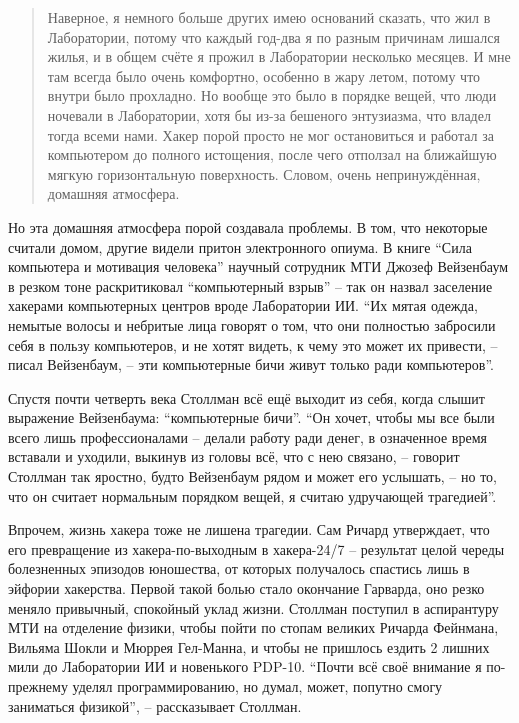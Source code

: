 \begin{quote}
Наверное, я немного больше других имею оснований сказать, что жил в Лаборатории, потому что каждый год-два я по разным причинам лишался жилья, и в общем счёте я прожил в Лаборатории несколько месяцев. И мне там всегда было очень комфортно, особенно в жару летом, потому что внутри было прохладно. Но вообще это было в порядке вещей, что люди ночевали в Лаборатории, хотя бы из-за бешеного энтузиазма, что владел тогда всеми нами. Хакер порой просто не мог остановиться и работал за компьютером до полного истощения, после чего отползал на ближайшую мягкую горизонтальную поверхность. Словом, очень непринуждённая, домашняя атмосфера.
\end{quote}

Но эта домашняя атмосфера порой создавала проблемы. В том, что некоторые считали домом, другие видели притон электронного опиума. В книге \enquote{Сила компьютера и мотивация человека} научный сотрудник МТИ Джозеф Вейзенбаум в резком тоне раскритиковал \enquote{компьютерный взрыв} -- так он назвал заселение хакерами компьютерных центров вроде Лаборатории ИИ. \enquote{Их мятая одежда, немытые волосы и небритые лица говорят о том, что они полностью забросили себя в пользу компьютеров, и не хотят видеть, к чему это может их привести, -- писал Вейзенбаум, -- эти компьютерные бичи живут только ради компьютеров}. 

Спустя почти четверть века Столлман всё ещё выходит из себя, когда слышит выражение Вейзенбаума: \enquote{компьютерные бичи}. \enquote{Он хочет, чтобы мы все были всего лишь профессионалами -- делали работу ради денег, в означенное время вставали и уходили, выкинув из головы всё, что с нею связано, -- говорит Столлман так яростно, будто Вейзенбаум рядом и может его услышать, -- но то, что он считает нормальным порядком вещей, я считаю удручающей трагедией}.

Впрочем, жизнь хакера тоже не лишена трагедии. Сам Ричард утверждает, что его превращение из хакера-по-выходным в хакера-24/7 -- результат целой череды болезненных эпизодов юношества, от которых получалось спастись лишь в эйфории хакерства. Первой такой болью стало окончание Гарварда, оно резко меняло привычный, спокойный уклад жизни. Столлман поступил в аспирантуру МТИ на отделение физики, чтобы пойти по стопам великих Ричарда Фейнмана, Вильяма Шокли и Мюррея Гел-Манна, и чтобы не пришлось ездить 2 лишних мили до Лаборатории ИИ и новенького PDP-10. \enquote{Почти всё своё внимание я по-прежнему уделял программированию, но думал, может, попутно смогу заниматься физикой}, -- рассказывает Столлман.

